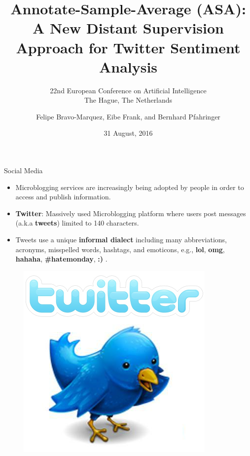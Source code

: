 \documentclass[handout]{beamer}
\title{Annotate-Sample-Average (ASA): A New Distant Supervision Approach for Twitter Sentiment Analysis}
\subtitle[ECAI'16]{22nd European Conference on Artificial Intelligence\\ The Hague, The Netherlands}
\author[Felipe Bravo Márquez]{\footnotesize
Felipe Bravo-Marquez, Eibe Frank, and Bernhard Pfahringer}
\institute{University of Waikato \\ Computer Science Department }
\date{31 August, 2016}
\begin{document}
\begin{frame}
\titlepage


\end{frame}


\begin{frame}{Social Media}
\begin{scriptsize}
\begin{itemize}
 \item Microblogging services are increasingly being adopted by people in order to access and publish information.  
 \item \textbf{Twitter}: Massively used Microblogging platform where users post messages (a.k.a \textbf{tweets}) limited to 140 characters. 
 \item Tweets use a unique \textbf{informal dialect} including many abbreviations, acronyms, misspelled words, hashtags, and emoticons, e.g., \textbf{lol}, \textbf{omg}, \textbf{hahaha}, \textbf{\#hatemonday}, \textbf{:)} .
\end{itemize}
  \begin{figure}[h]
        	\includegraphics[scale = 0.2]{pics/twitter.png}
        \end{figure}

\end{scriptsize}
\end{frame}
\end{document}
